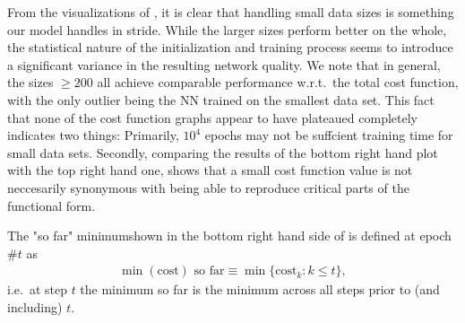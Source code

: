 \documentclass[../../master.tex]{subfiles}
\begin{document}
From the visualizations of , it is clear that handling small data sizes is something our model handles in stride. While the larger sizes perform better on the whole, the statistical nature of the initialization and training process seems to introduce a significant variance in the resulting network quality. We note that in general, the sizes $\ge200$ all achieve comparable performance w.r.t.\ the total cost function, with the only outlier being the NN trained on the smallest data set. This fact that none of the cost function graphs appear to have plateaued completely indicates two things: Primarily, $10^4$ epochs may not be suffcient training time for small data sets. Secondly, comparing the results of the bottom right hand plot with the top right hand one, shows that a small cost function value is not neccesarily synonymous with being able to reproduce critical parts of the functional form.

The "so far" minimum\textemdash shown in the bottom right hand side of \textemdash is defined at epoch $\#t$ as 
\begin{align}
\min(\text{cost})\text{ so far} \equiv \min\{\text{cost}_k:k\le t\},
\end{align}
i.e.\ at step $t$ the minimum so far is the minimum across all steps prior to (and including) $t$. 
\end{document}
